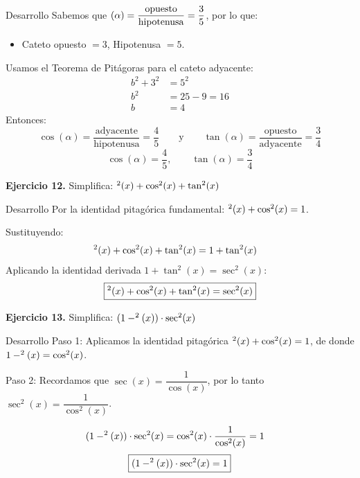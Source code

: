 \documentclass[letterpaper, 12pt]{article}
\let\sin\relax
\DeclareMathOperator{\sin}{sen}
\begin{document}
\begin{solucionbox}{Desarrollo}
Sabemos que $\sin(\alpha) = \dfrac{\text{opuesto}}{\text{hipotenusa}} = \dfrac{3}{5}$, por lo que:
\begin{itemize}[leftmargin=*]
    \item Cateto opuesto $= 3$, Hipotenusa $= 5$.
\end{itemize}
Usamos el Teorema de Pitágoras para el cateto adyacente:
\begin{align*}
    b^2 + 3^2 &= 5^2 \\
    b^2 &= 25 - 9 = 16 \\
    b &= 4
\end{align*}
Entonces:
\[
    \cos(\alpha) = \frac{\text{adyacente}}{\text{hipotenusa}} = \frac{4}{5} \qquad \text{y} \qquad \tan(\alpha) = \frac{\text{opuesto}}{\text{adyacente}} = \frac{3}{4}
\]
\[\boxed{\cos(\alpha) = \frac{4}{5}, \qquad \tan(\alpha) = \frac{3}{4}}\]
\end{solucionbox}

\vspace{0.4cm}

\textbf{Ejercicio 12.} Simplifica: $\sin^2(x) + \cos^2(x) + \tan^2(x)$

\begin{solucionbox}{Desarrollo}
Por la identidad pitagórica fundamental: $\sin^2(x) + \cos^2(x) = 1$.

Sustituyendo:
\begin{align*}
    \sin^2(x) + \cos^2(x) + \tan^2(x) &= 1 + \tan^2(x)
\end{align*}
Aplicando la identidad derivada $1 + \tan^2(x) = \sec^2(x)$:
\[\boxed{\sin^2(x) + \cos^2(x) + \tan^2(x) = \sec^2(x)}\]
\end{solucionbox}

\vspace{0.4cm}

\textbf{Ejercicio 13.} Simplifica: $(1 - \sin^2(x)) \cdot \sec^2(x)$

\begin{solucionbox}{Desarrollo}
Paso 1: Aplicamos la identidad pitagórica $\sin^2(x) + \cos^2(x) = 1$, de donde $1 - \sin^2(x) = \cos^2(x)$.

Paso 2: Recordamos que $\sec(x) = \dfrac{1}{\cos(x)}$, por lo tanto $\sec^2(x) = \dfrac{1}{\cos^2(x)}$.

\begin{align*}
    (1 - \sin^2(x)) \cdot \sec^2(x) &= \cos^2(x) \cdot \frac{1}{\cos^2(x)} = 1
\end{align*}
\[\boxed{(1 - \sin^2(x)) \cdot \sec^2(x) = 1}\]
\end{solucionbox}
\end{document}
